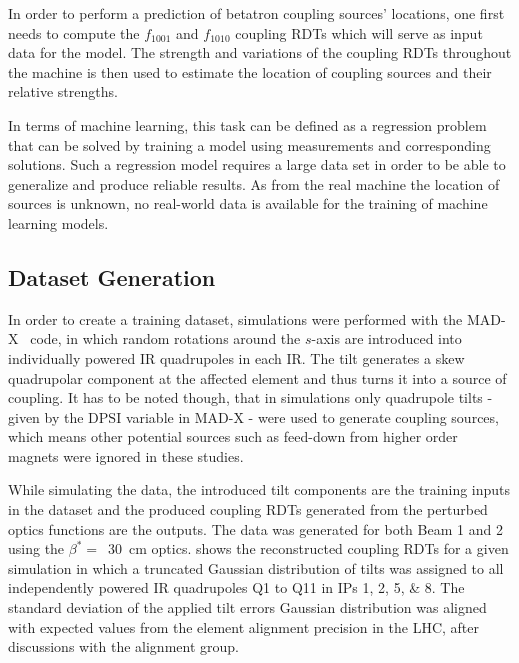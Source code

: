 In order to perform a prediction of betatron coupling sources' locations, one first needs to compute the \(f_{1001}\) and \(f_{1010}\) coupling RDTs which will serve as input data for the model.
The strength and variations of the coupling RDTs throughout the machine is then used to estimate the location of coupling sources and their relative strengths.

In terms of machine learning, this task can be defined as a regression problem that can be solved by training a model using measurements and corresponding solutions.
Such a regression model requires a large data set in order to be able to generalize and produce reliable results.
As from the real machine the location of sources is unknown, no real-world data is available for the training of machine learning models.

\subsection{Dataset Generation}

In order to create a training dataset, simulations were performed with the MAD-X~\cite{CODE:MADX_guide} code, in which random rotations around the \(s\)-axis are introduced into individually powered IR quadrupoles in each IR.
The tilt generates a skew quadrupolar component at the affected element and thus turns it into a source of coupling.
It has to be noted though, that in simulations only quadrupole tilts - given by the \(\mathrm{DPSI}\) variable in MAD-X - were used to generate coupling sources, which means other potential sources such as feed-down from higher order magnets were ignored in these studies.

While simulating the data, the introduced tilt components are the training inputs in the dataset and the produced coupling RDTs generated from the perturbed optics functions are the outputs.
The data was generated for both Beam 1 and 2 using the \(\beta^{\ast}=\)~\qty{30}{\centi\meter} optics.
 shows the reconstructed coupling RDTs for a given simulation in which a truncated Gaussian distribution of tilts was assigned to all independently powered IR quadrupoles Q\num{1} to Q\num{11} in IPs \numlist{1;2;5;8}.
The standard deviation of the applied tilt errors Gaussian distribution was aligned with expected values from the element alignment precision in the LHC, after discussions with the alignment group.


